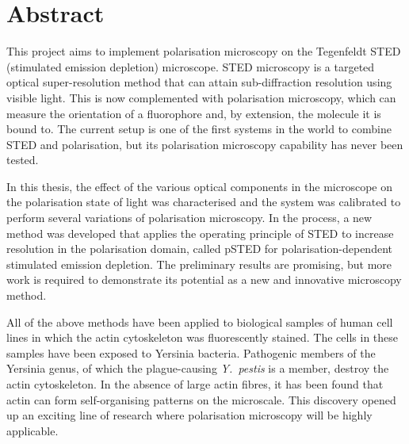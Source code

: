 \chapter{Abstract}

This project aims to implement polarisation microscopy on the Tegenfeldt STED (stimulated emission depletion) microscope. STED microscopy is a targeted optical super-resolution method that can attain sub-diffraction resolution using visible light. This is now complemented with polarisation microscopy, which can measure the orientation of a fluorophore and, by extension, the molecule it is bound to. The current setup is one of the first systems in the world to combine STED and polarisation, but its polarisation microscopy capability has never been tested.

In this thesis, the effect of the various optical components in the microscope on the polarisation state of light was characterised and the system was calibrated to perform several variations of polarisation microscopy. In the process, a new method was developed that applies the operating principle of STED to increase resolution in the polarisation domain, called pSTED for polarisation-dependent stimulated emission depletion. The preliminary results are promising, but more work is required to demonstrate its potential as a new and innovative microscopy method.

All of the above methods have been applied to biological samples of human cell lines in which the actin cytoskeleton was fluorescently stained. The cells in these samples have been exposed to Yersinia bacteria. Pathogenic members of the Yersinia genus, of which the plague-causing \emph{Y.~pestis} is a member, destroy the actin cytoskeleton. In the absence of large actin fibres, it has been found that actin can form self-organising patterns on the microscale. This discovery opened up an exciting line of research where polarisation microscopy will be highly applicable.